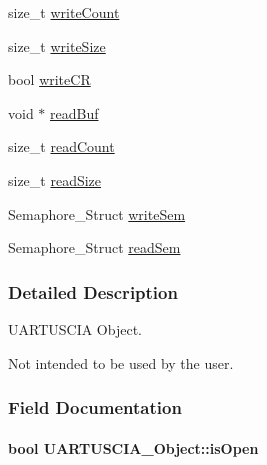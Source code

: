 \begin{DoxyCompactItemize}
\item 
size\-\_\-t \hyperlink{struct_u_a_r_t_u_s_c_i_a___object_aee4f305446fbc61c6935e692384f72cc}{write\-Count}
\item 
size\-\_\-t \hyperlink{struct_u_a_r_t_u_s_c_i_a___object_adc9865fce35c011954aa0871dacca758}{write\-Size}
\item 
bool \hyperlink{struct_u_a_r_t_u_s_c_i_a___object_a5e33711aa2a63b6f4e80c934aafcfa3c}{write\-C\-R}
\item 
void $\ast$ \hyperlink{struct_u_a_r_t_u_s_c_i_a___object_a4ff39008eae85b310fa48359f90179d0}{read\-Buf}
\item 
size\-\_\-t \hyperlink{struct_u_a_r_t_u_s_c_i_a___object_adb1e69a9b2ef8037b082d47f84cdabe5}{read\-Count}
\item 
size\-\_\-t \hyperlink{struct_u_a_r_t_u_s_c_i_a___object_a090e54b299cba93e4ae8494081c9cb1d}{read\-Size}
\item 
Semaphore\-\_\-\-Struct \hyperlink{struct_u_a_r_t_u_s_c_i_a___object_a5c99cc071d0e9d71c329147a65dcc95e}{write\-Sem}
\item 
Semaphore\-\_\-\-Struct \hyperlink{struct_u_a_r_t_u_s_c_i_a___object_a7f88d31f755309e5b48fc2b5256db1ad}{read\-Sem}
\end{DoxyCompactItemize}


\subsubsection{Detailed Description}
U\-A\-R\-T\-U\-S\-C\-I\-A Object. 

Not intended to be used by the user. 

\subsubsection{Field Documentation}
\paragraph[{is\-Open}]{\setlength{\rightskip}{0pt plus 5cm}bool U\-A\-R\-T\-U\-S\-C\-I\-A\-\_\-\-Object\-::is\-Open}\label{struct_u_a_r_t_u_s_c_i_a___object_a95e071a9a1ef58077fa291a1ca259419}
